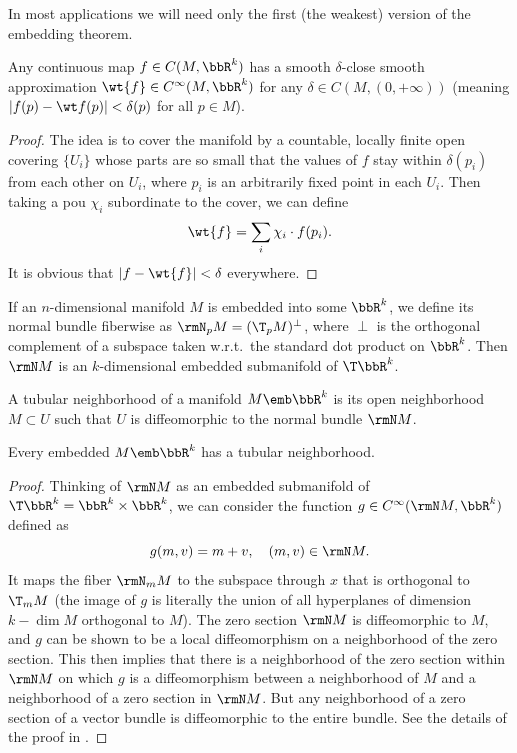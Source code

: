 In most applications we will need only the first (the weakest) version of the embedding theorem.


\begin{thm}\label{cor 6.22 Lee}
    Any continuous map $f\in C(M,\bbR^k)$ has a smooth $\delta$-close smooth approximation $\wt{f}\in C^\infty(M,\bbR^k)$ for any $\delta\in C(M,(0,+\infty))$ (meaning $|f(p)-\wt f(p)|<\delta(p)$ for all $p\in M$).
\end{thm}
\begin{proof}
    The idea is to cover the manifold by a countable, locally finite open covering $\{U_i\}$ whose parts are so small that the values of $f$ stay within $\delta(p_i)$ from each other on $U_i$, where $p_i$ is an arbitrarily fixed point in each $U_i$. Then taking a \gls{pou} $\chi_i$ subordinate to the cover, we can define
    \[
        \wt{f}=\sum_i \chi_i\cdot f(p_i).
    \]
    It is obvious that $|f-\wt{f}|<\delta$ everywhere.
\end{proof}

\begin{defn}
    If an $n$-dimensional manifold $M$ is embedded into some $\bbR^k$, we define its normal bundle fiberwise as $\rmN_p M=(\T_p M)^\perp$, where $\perp$ is the orthogonal complement of a subspace taken w.r.t.\ the standard dot product on $\bbR^k$. Then $\rmN M$ is an $k$-dimensional embedded submanifold of $\T\bbR^k$.
\end{defn}

\begin{defn}
    A tubular neighborhood of a manifold $M\emb \bbR^k$ is its open neighborhood $M\subset U$ such that $U$ is diffeomorphic to the normal bundle $\rmN M$.
\end{defn}

\begin{thm}\label{thm tubular neighb}
    Every embedded $M\emb \bbR^k$ has a tubular neighborhood.
\end{thm}
\begin{proof}
    Thinking of $\rmN M$ as an embedded submanifold of $\T\bbR^k=\bbR^k\times\bbR^k$, we can consider the function $g\in C^\infty(\rmN M,\bbR^k)$ defined as
    \[
        g(m,v)=m+v,\quad (m,v)\in \rmN M.
    \]
    It maps the fiber $\rmN_m M$ to the subspace through $x$ that is orthogonal to $\T_m M$ (the image of $g$ is literally the union of all hyperplanes of dimension $k-\dim M$ orthogonal to $M$).
    The zero section $\rmN M$ is diffeomorphic to $M$, and $g$ can be shown to be a local diffeomorphism on a neighborhood of the zero section. This then implies that there is a neighborhood of the zero section within $\rmN M$ on which $g$ is a diffeomorphism between a neighborhood of $M$ and a neighborhood of a zero section in $\rmN M$. But any neighborhood of a zero section of a vector bundle is diffeomorphic to the entire bundle. See the details of the proof in \cite[Thm.~6.24]{Lee}.
\end{proof}

